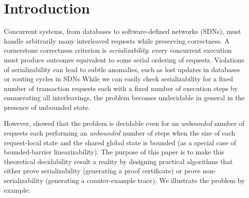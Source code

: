 \section{Introduction}
\label{sec:introduction}

Concurrent systems, from databases to software-defined networks (SDNs), must handle arbitrarily many interleaved requests while preserving correctness. A cornerstone correctness criterion is \emph{serializability}: every concurrent execution must produce outcomes equivalent to some serial ordering of requests. Violations of serializability can lead to subtle anomalies, such as lost updates in databases or routing cycles in SDNs
While we can easily check serializability for a fixed number of transaction requests each with a fixed number of execution steps by enumerating all interleavings, the problem becomes undecidable in general in the presence of unbounded state.

However, \citet{BoEmEnHa13} showed that the problem is decidable even for an \emph{unbounded} number of requests each performing an \emph{unbounded} number of steps when the size of each request-local state and the shared global state is bounded (as a special case of bounded-barrier linearizability). The purpose of this paper is to make this theoretical decidability result a reality by designing practical algorithms that either prove serializability (generating a proof certificate) or prove non-serializability (generating a counter-example trace).
% 
We illustrate the problem by example:


